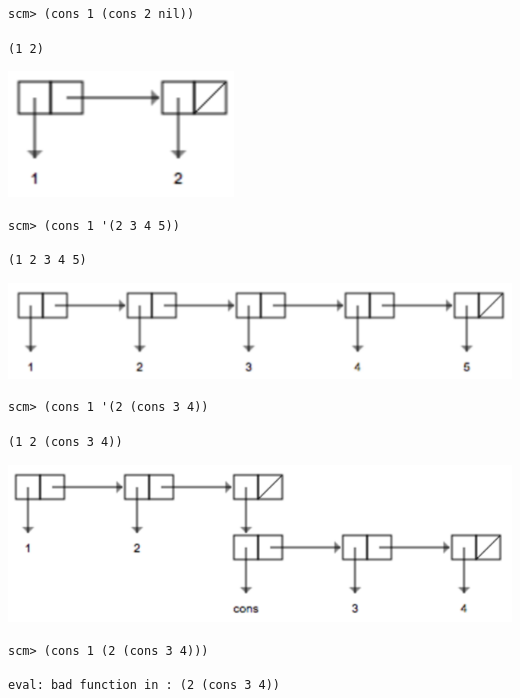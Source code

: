 \documentclass{exam}
\begin{document}
\begin{questions}
\begin{blocksection}
\begin{lstlisting}
scm> (cons 1 (cons 2 nil))
\end{lstlisting}
\begin{solution}[0.25in]
\texttt{(1 2)}
\begin{center}
\includegraphics[scale=0.7]{9b}
\end{center}
\end{solution}

\begin{lstlisting}
scm> (cons 1 '(2 3 4 5))
\end{lstlisting}
\begin{solution}[0.25in]
\texttt{(1 2 3 4 5)}
\begin{center}
\includegraphics[scale=0.7]{9c}
\end{center}
\end{solution}

\begin{lstlisting}
scm> (cons 1 '(2 (cons 3 4))
\end{lstlisting}
\begin{solution}[0.25in]
\texttt{(1 2 (cons 3 4))}
\begin{center}
\includegraphics[scale=0.7]{9d}
\end{center}
\end{solution}

\begin{lstlisting}
scm> (cons 1 (2 (cons 3 4)))
\end{lstlisting}
\begin{solution}[.25in]
\begin{lstlisting}
eval: bad function in : (2 (cons 3 4))
\end{lstlisting}
\end{solution}
\end{blocksection}


\end{questions}
\end{document}
